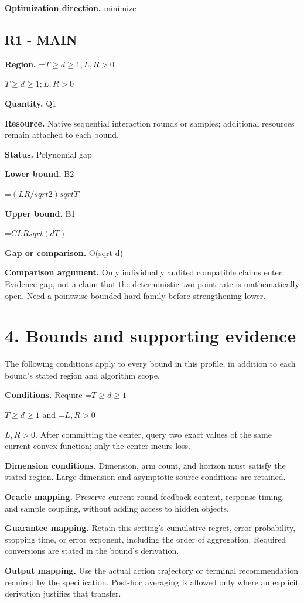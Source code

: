 \documentclass[10pt,a4paper]{article}
\newcommand{\AtlasMath}[1]{\par\begingroup\centering\setbox0=\hbox{$\displaystyle #1$}\ifdim\wd0>1.4\linewidth\typeout{ATLAS WIDE FORMULA: \the\wd0}\fi\ifdim\wd0>\linewidth\resizebox{\linewidth}{!}{\box0}\else\box0\fi\par\endgroup}
\newcommand{\AtlasInlineMath}[1]{\begingroup\setbox0=\hbox{$#1$}\ifdim\wd0>.4\linewidth\endgroup\AtlasMath{#1}\else\endgroup$#1$\fi}
\begin{document}
\textbf{Optimization direction.} minimize

\subsection{R1 - MAIN}
\textbf{Region.} \AtlasInlineMath{T\ge d\ge 1; L,R>0}

\textbf{Quantity.} Q1

\textbf{Resource.} Native sequential interaction rounds or samples; additional resources remain attached to each bound.

\textbf{Status.} Polynomial gap

\textbf{Lower bound.} B2

\AtlasMath{(LR/sqrt2)sqrtT}
\textbf{Upper bound.} B1

\AtlasMath{C LRsqrt(dT)}
\textbf{Gap or comparison.} O(sqrt d)

\textbf{Comparison argument.} Only individually audited compatible claims enter. Evidence gap, not a claim that the deterministic two-point rate is mathematically open. Need a pointwise bounded hard family before strengthening lower.

\section{4. Bounds and supporting evidence}
The following conditions apply to every bound in this profile, in addition to each bound's stated region and algorithm scope.

\textbf{Conditions.} Require \AtlasInlineMath{T\ge d\ge1} and \AtlasInlineMath{L,R>0}. After committing the center, query two exact values of the same current convex function; only the center incurs loss.

\textbf{Dimension conditions.} Dimension, arm count, and horizon must satisfy the stated region. Large-dimension and asymptotic source conditions are retained.

\textbf{Oracle mapping.} Preserve current-round feedback content, response timing, and sample coupling, without adding access to hidden objects.

\textbf{Guarantee mapping.} Retain this setting's cumulative regret, error probability, stopping time, or error exponent, including the order of aggregation. Required conversions are stated in the bound's derivation.

\textbf{Output mapping.} Use the actual action trajectory or terminal recommendation required by the specification. Post-hoc averaging is allowed only where an explicit derivation justifies that transfer.
\end{document}

